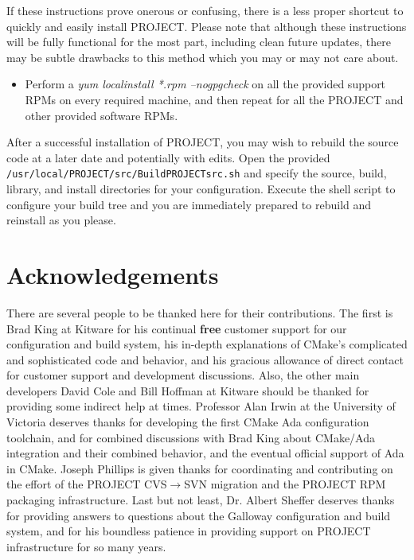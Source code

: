\documentclass[12pt,letterpaper]{article}
\begin{document}
If these instructions prove onerous or confusing, there is a less proper shortcut to quickly and easily install PROJECT.  Please note that although these instructions will be fully functional for the most part, including clean future updates, there may be subtle drawbacks to this method which you may or may not care about.

\begin{itemize}
\item Perform a \emph{yum localinstall *.rpm --nogpgcheck} on all the provided support RPMs on every required machine, and then repeat for all the PROJECT and other provided software RPMs.
\end{itemize}

After a successful installation of PROJECT, you may wish to rebuild the source code at a later date and potentially with edits.  Open the provided \verb|/usr/local/PROJECT/src/BuildPROJECTsrc.sh| and specify the source, build, library, and install directories for your configuration.  Execute the shell script to configure your build tree and you are immediately prepared to rebuild and reinstall as you please.

\section{Acknowledgements}

There are several people to be thanked here for their contributions.  The first is Brad King at Kitware for his continual \textbf{free} customer support for our configuration and build system, his in-depth explanations of CMake's complicated and sophisticated code and behavior, and his gracious allowance of direct contact for customer support and development discussions.  Also, the other main developers David Cole and Bill Hoffman at Kitware should be thanked for providing some indirect help at times.  Professor Alan Irwin at the University of Victoria deserves thanks for developing the first CMake Ada configuration toolchain, and for combined discussions with Brad King about CMake/Ada integration and their combined behavior, and the eventual official support of Ada in CMake.  Joseph Phillips is given thanks for coordinating and contributing on the effort of the PROJECT CVS$\rightarrow$SVN migration and the PROJECT RPM packaging infrastructure.  Last but not least, Dr. Albert Sheffer deserves thanks for providing answers to questions about the Galloway configuration and build system, and for his boundless patience in providing support on PROJECT infrastructure for so many years.
\end{document}
